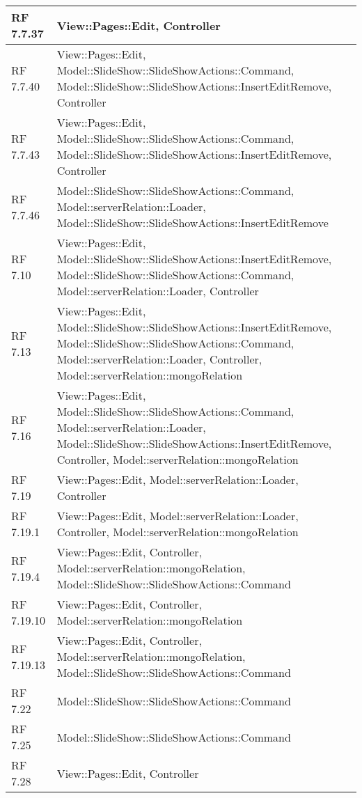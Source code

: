 {\begin{longtable} [c]{| p{2cm} | p{13cm} |}
 \hline 
RF 7.7.37 & View::\-Pages::\-Edit, Controller\\ 
 \hline 
RF 7.7.40 & View::\-Pages::\-Edit, Model::\-SlideShow::\-SlideShowActions::\-Command, Model::\-SlideShow::\-SlideShowActions::\-InsertEditRemove, Controller\\ 
 \hline 
RF 7.7.43 & View::\-Pages::\-Edit, Model::\-SlideShow::\-SlideShowActions::\-Command, Model::\-SlideShow::\-SlideShowActions::\-InsertEditRemove, Controller\\ 
 \hline 
RF 7.7.46 & Model::\-SlideShow::\-SlideShowActions::\-Command, Model::\-serverRelation::\-Loader, Model::\-SlideShow::\-SlideShowActions::\-InsertEditRemove\\ 
 \hline 
RF 7.10 & View::\-Pages::\-Edit, Model::\-SlideShow::\-SlideShowActions::\-InsertEditRemove, Model::\-SlideShow::\-SlideShowActions::\-Command, Model::\-serverRelation::\-Loader, Controller\\ 
 \hline 
RF 7.13 & View::\-Pages::\-Edit, Model::\-SlideShow::\-SlideShowActions::\-InsertEditRemove, Model::\-SlideShow::\-SlideShowActions::\-Command, Model::\-serverRelation::\-Loader, Controller, Model::\-serverRelation::\-mongoRelation\\ 
 \hline 
RF 7.16 & View::\-Pages::\-Edit, Model::\-SlideShow::\-SlideShowActions::\-Command, Model::\-serverRelation::\-Loader, Model::\-SlideShow::\-SlideShowActions::\-InsertEditRemove, Controller, Model::\-serverRelation::\-mongoRelation\\ 
 \hline 
RF 7.19 & View::\-Pages::\-Edit, Model::\-serverRelation::\-Loader, Controller\\ 
 \hline 
RF 7.19.1 & View::\-Pages::\-Edit, Model::\-serverRelation::\-Loader, Controller, Model::\-serverRelation::\-mongoRelation\\ 
 \hline 
RF 7.19.4 & View::\-Pages::\-Edit, Controller, Model::\-serverRelation::\-mongoRelation, Model::\-SlideShow::\-SlideShowActions::\-Command\\ 
 \hline 
RF 7.19.10 & View::\-Pages::\-Edit, Controller, Model::\-serverRelation::\-mongoRelation\\ 
 \hline 
RF 7.19.13 & View::\-Pages::\-Edit, Controller, Model::\-serverRelation::\-mongoRelation, Model::\-SlideShow::\-SlideShowActions::\-Command\\ 
 \hline 
RF 7.22 & Model::\-SlideShow::\-SlideShowActions::\-Command\\ 
 \hline 
RF 7.25 & Model::\-SlideShow::\-SlideShowActions::\-Command\\ 
 \hline 
RF 7.28 & View::\-Pages::\-Edit, Controller\\ 

\end{longtable}}
